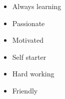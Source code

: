 %
%
%

\twocolumnsection
{
\begin{skills}
\end{skills}}
{
\vspace{1em}
\begin{itemize}
	\item Always learning
	\item Passionate
	\item Motivated                    
        \item Self starter
        \item Hard working
        \item Friendly
\end{itemize}
}
